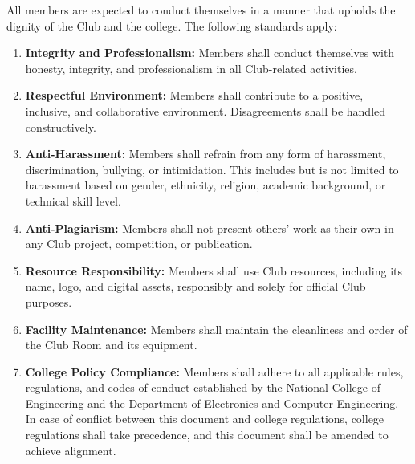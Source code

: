 

All members are expected to conduct themselves in a manner that upholds the dignity of the Club and the college. The following standards apply:

\begin{enumerate}[label=\alph*), leftmargin=2em, itemsep=0.3em]
    \item \textbf{Integrity and Professionalism:} Members shall conduct themselves with honesty, integrity, and professionalism in all Club-related activities.
    
    \item \textbf{Respectful Environment:} Members shall contribute to a positive, inclusive, and collaborative environment. Disagreements shall be handled constructively.
    
    \item \textbf{Anti-Harassment:} Members shall refrain from any form of harassment, discrimination, bullying, or intimidation. This includes but is not limited to harassment based on gender, ethnicity, religion, academic background, or technical skill level.
    
    \item \textbf{Anti-Plagiarism:} Members shall not present others' work as their own in any Club project, competition, or publication.
    
    \item \textbf{Resource Responsibility:} Members shall use Club resources, including its name, logo, and digital assets, responsibly and solely for official Club purposes.
    
    \item \textbf{Facility Maintenance:} Members shall maintain the cleanliness and order of the Club Room and its equipment.
    
    \item \textbf{College Policy Compliance:} Members shall adhere to all applicable rules, regulations, and codes of conduct established by the National College of Engineering and the Department of Electronics and Computer Engineering. In case of conflict between this document and college regulations, college regulations shall take precedence, and this document shall be amended to achieve alignment.
    

\end{enumerate}
